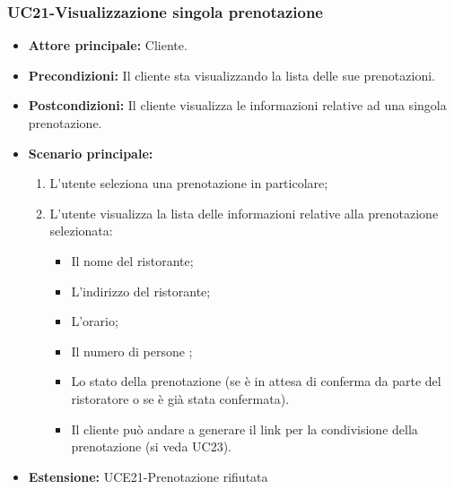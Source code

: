 \subsubsection{UC21-Visualizzazione singola prenotazione}
\begin{itemize}
    \item \textbf{Attore principale: } Cliente.
    \item \textbf{Precondizioni: }Il cliente sta visualizzando la lista delle sue prenotazioni.
    \item \textbf{Postcondizioni: }Il cliente visualizza le informazioni relative ad una singola prenotazione.
    \item \textbf{Scenario principale:} 
        \begin{enumerate}
            \item L'utente seleziona una prenotazione in particolare;
            \item L'utente visualizza la lista delle informazioni relative alla prenotazione selezionata:
            \begin{itemize}
                \item Il nome del ristorante;
                \item L'indirizzo del ristorante;
                \item L'orario;
                \item Il numero di persone ;
                \item Lo stato della prenotazione (se è in attesa di conferma da parte del ristoratore
                o se è già stata confermata).
            \item Il cliente può andare a generare il link per la condivisione della prenotazione (si veda UC23).
            \end{itemize}
        \end{enumerate}
    \item \textbf{Estensione: }UCE21-Prenotazione rifiutata
\end{itemize}

